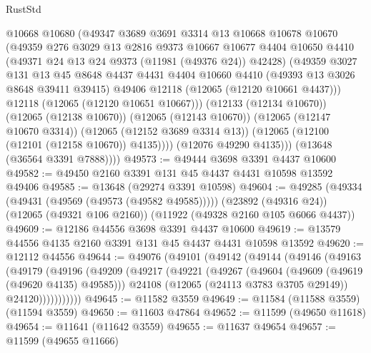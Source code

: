 \begin{lexlean}{RustStd}
\begin{coremodule}
              @10668
              @10680
              (@49347
                @3689
                @3691
                @3314
                @13
                @10668
                @10678
                @10670
                (@49359
                  @276
                  @3029
                  @13
                  @2816
                  @9373
                  @10667
                  @10677
                  @4404
                  @10650
                  @4410
                  (@49371 @24 @13 @24 @9373 (@11981 (@49376 @24)) @42428)
                  (@49359
                    @3027
                    @131
                    @13
                    @45
                    @8648
                    @4437
                    @4431
                    @4404
                    @10660
                    @4410
                    (@49393 @13 @3026 @8648 @39411 @39415)
                    @49406
                    @12118
                    (@12065 (@12120 @10661 @4437)))
                  @12118
                  (@12065 (@12120 @10651 @10667)))
                (@12133 (@12134 @10670))
                (@12065 (@12138 @10670))
                (@12065 (@12143 @10670))
                (@12065 (@12147 @10670 @3314))
                (@12065 (@12152 @3689 @3314 @13))
                (@12065 (@12100 (@12101 (@12158 @10670)) @4135))))
            (@12076 @49290 @4135)))
        (@13648 (@36564 @3391 @7888))))
@49573 := @49444 @3698 @3391 @4437 @10600
@49582 := @49450 @2160 @3391 @131 @45 @4437 @4431 @10598 @13592 @49406
@49585 := @13648 (@29274 @3391 @10598)
@49604 := @49285
    (@49334 (@49431 (@49569 (@49573 (@49582 @49585)))))
    (@23892 (@49316 @24))
    (@12065 (@49321 @106 @2160))
    (@11922 (@49328 @2160 @105 @6066 @4437))
@49609 := @12186 @44556 @3698 @3391 @4437 @10600
@49619 := @13579 @44556 @4135 @2160 @3391 @131 @45 @4437 @4431 @10598 @13592
@49620 := @12112 @44556
@49644 := @49076
    (@49101
      (@49142
        (@49144
          (@49146
            (@49163
              (@49179
                (@49196
                  (@49209
                    (@49217
                      (@49221
                        (@49267
                          (@49604 (@49609 (@49619 (@49620 @4135) @49585)))
                          @24108
                          (@12065 (@24113 @3783 @3705 @29149))
                          @24120)))))))))))
@49645 := @11582 @3559
@49649 := @11584 (@11588 @3559) (@11594 @3559)
@49650 := @11603 @47864
@49652 := @11599 (@49650 @11618)
@49654 := @11641 (@11642 @3559)
@49655 := @11637 @49654
@49657 := @11599 (@49655 @11666)

\end{coremodule}
\end{lexlean}
